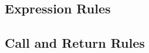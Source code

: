 \documentclass[acmsmall,review,anonymous]{acmart}\settopmatter{printfolios=true,printccs=false,printacmref=false}
\begin{document}
\forinitstep
\forstep
\forfalsestep
\fortruestep
\forskiporcontinuestep
\forbreakstep
\forskippoststep

\subsection{Expression Rules}

\allocstep
\valofstep
\assignopstep
\postincstep
\assignstep
\varstep
\unopstep
\binopstep
\callexprstep

\subsection{Call and Return Rules}

\callstep
\returnstep
\end{document}
